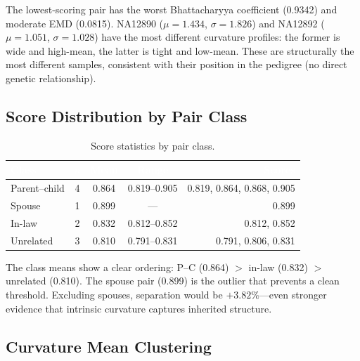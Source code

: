 \documentclass{../yalumba}
\begin{document}
The lowest-scoring pair has the worst Bhattacharyya coefficient (0.9342)
and moderate EMD (0.0815).  NA12890 ($\mu = 1.434$, $\sigma = 1.826$) and
NA12892 ($\mu = 1.051$, $\sigma = 1.028$) have the most different curvature
profiles: the former is wide and high-mean, the latter is tight and low-mean.
These are structurally the most different samples, consistent with their
position in the pedigree (no direct genetic relationship).

\subsection{Score Distribution by Pair Class}

\begin{table}[H]
  \centering
  \tablestyle
  \caption{Score statistics by pair class.}
  \label{tab:class-stats}
  \begin{tabular}{lcccr}
    \toprule
    \rowcolor{table-header}
    \textcolor{white}{\textbf{Class}} &
    \textcolor{white}{\textbf{$n$}} &
    \textcolor{white}{\textbf{Mean}} &
    \textcolor{white}{\textbf{Range}} &
    \textcolor{white}{\textbf{Scores}} \\
    \midrule
    Parent--child & 4 & 0.864 & 0.819--0.905 & \scriptsize 0.819, 0.864, 0.868, 0.905 \\
    Spouse & 1 & 0.899 & --- & \scriptsize 0.899 \\
    In-law & 2 & 0.832 & 0.812--0.852 & \scriptsize 0.812, 0.852 \\
    Unrelated & 3 & 0.810 & 0.791--0.831 & \scriptsize 0.791, 0.806, 0.831 \\
    \bottomrule
  \end{tabular}
\end{table}

The class means show a clear ordering: P--C (0.864) $>$ in-law (0.832) $>$
unrelated (0.810).  The spouse pair (0.899) is the outlier that prevents
a clean threshold.  Excluding spouses, separation would be $+3.82\%$---even
stronger evidence that intrinsic curvature captures inherited structure.

\subsection{Curvature Mean Clustering}
\end{document}
